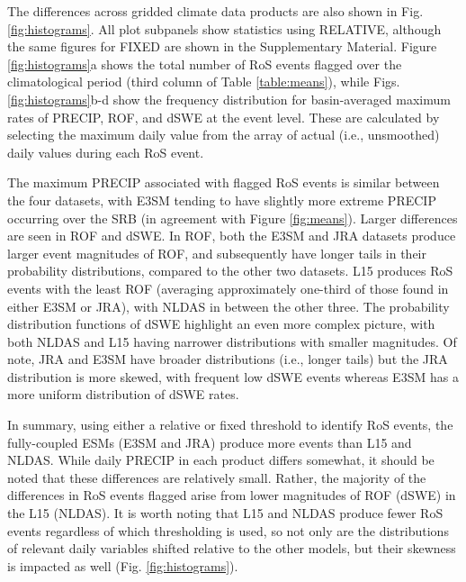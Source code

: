 \documentclass[draft]{agujournal2019}
\begin{document}
The differences across gridded climate data products are also shown in Fig. \ref{fig:histograms}. 
All plot subpanels show statistics using RELATIVE, although the same figures for FIXED are shown in the Supplementary Material. 
Figure \ref{fig:histograms}a shows the total number of RoS events flagged over the climatological period (third column of Table \ref{table:means}), while Figs. \ref{fig:histograms}b-d show the frequency distribution for basin-averaged maximum rates of PRECIP, ROF, and dSWE at the event level. These are calculated by selecting the maximum daily value from the array of actual (i.e., unsmoothed) daily values during each RoS event.

The maximum PRECIP associated with flagged RoS events is similar between the four datasets, with E3SM tending to have slightly more extreme PRECIP occurring over the SRB (in agreement with Figure \ref{fig:means}). 
Larger differences are seen in ROF and dSWE. 
In ROF, both the E3SM and JRA datasets produce larger event magnitudes of ROF, and subsequently have longer tails in their probability distributions, compared to the other two datasets. 
L15 produces RoS events with the least ROF (averaging approximately one-third of those found in either E3SM or JRA), with NLDAS in between the other three. 
The probability distribution functions of dSWE highlight an even more complex picture, with both NLDAS and L15 having narrower distributions with smaller magnitudes. 
Of note, JRA and E3SM have broader distributions (i.e., longer tails) but the JRA distribution is more skewed, with frequent low dSWE events whereas E3SM has a more uniform distribution of dSWE rates.

In summary, using either a relative or fixed threshold to identify RoS events, the fully-coupled ESMs (E3SM and JRA) produce more events than L15 and NLDAS.
While daily PRECIP in each product differs somewhat, it should be noted that these differences are relatively small.
Rather, the majority of the differences in RoS events flagged arise from lower magnitudes of ROF (dSWE) in the L15 (NLDAS). 
It is worth noting that L15 and NLDAS produce fewer RoS events regardless of which thresholding is used, so not only are the distributions of relevant daily variables shifted relative to the other models, but their skewness is impacted as well (Fig. \ref{fig:histograms}).
\end{document}
